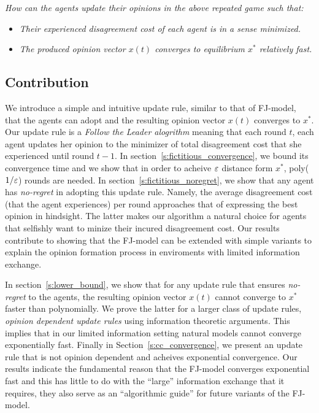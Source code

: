 \emph{How can the agents update their opinions in the above
repeated game such that:}
\begin{itemize}
\item \emph{Their experienced disagreement cost of each agent is in a sense minimized.}
\item \emph{The produced opinion vector $x(t)$ converges to equilibrium $x^*$
 relatively fast.}
\end{itemize}

\subsection{Contribution}
We introduce a simple and intuitive update rule,
similar to that of FJ-model, that the agents can adopt
and the resulting opinion vector $x(t)$ converges to $x^*$.
Our update rule is a \emph{Follow the Leader alogrithm}
meaning that each round $t$, each agent updates her opinion
to the minimizer of total disagreement cost that
she experienced until round $t-1$. In section~\ref{s:fictitious_convergence},
we bound its convergence time and we show that in order
to acheive $\varepsilon$ distance form $x^*$, poly($1/\varepsilon$) rounds 
are needed. In section~\ref{s:fictitious_noregret},
we show that any agent has \emph{no-regret} in adopting
this update rule. Namely, the average disagreement cost (that
the agent experiences) per round approaches that
of expressing the best opinion in hindsight. The latter
makes our algorithm a natural choice for agents that 
selfishly want to minize their incured disagreement cost.
Our results contribute to showing that the FJ-model 
can be extended with simple variants to explain
the opinion formation process in enviroments with limited
information exchange. 

In section~\ref{s:lower_bound}, we show 
that for any update rule that ensures \emph{no-regret}
to the agents, the resulting opinion vector $x(t)$
cannot converge to $x^*$ faster than polynomially. We
prove the latter for a larger class of update rules,
\emph{opinion dependent update rules} using information
theoretic arguments. This implies that in our limited 
information setting natural models cannot converge exponentially
fast. Finally in Section~\ref{s:cc_convergence}, we present 
an update rule that is not opinion dependent and acheives exponential
convergence. Our results indicate the fundamental reason that
the FJ-model converges exponential fast and this has little 
to do with the \enquote{large} information exchange that it requires,
they also serve as an \enquote{algorithmic guide} for future 
variants of the FJ-model. 



